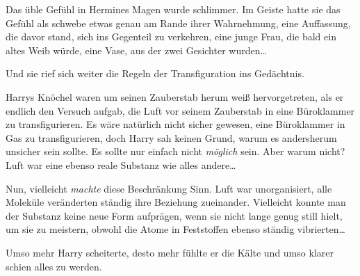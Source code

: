 Das üble Gefühl in Hermines Magen wurde schlimmer. Im Geiste hatte sie das Gefühl als schwebe etwas genau am Rande ihrer Wahrnehmung, eine Auffassung, die davor stand, sich ins Gegenteil zu verkehren, eine junge Frau, die bald ein altes Weib würde, eine Vase, aus der zwei Gesichter wurden…

Und sie rief sich weiter die Regeln der Transfiguration ins Gedächtnis.

\later

Harrys Knöchel waren um seinen Zauberstab herum weiß hervorgetreten, als er endlich den Versuch aufgab, die Luft vor seinem Zauberstab in eine Büroklammer zu transfigurieren. Es wäre natürlich nicht sicher gewesen, eine Büroklammer in Gas zu transfigurieren, doch Harry sah keinen Grund, warum es andersherum unsicher sein sollte. Es sollte nur einfach nicht \emph{möglich} sein. Aber warum nicht? Luft war eine ebenso reale Substanz wie alles andere…

Nun, vielleicht \emph{machte} diese Beschränkung Sinn. Luft war unorganisiert, alle Moleküle veränderten ständig ihre Beziehung zueinander. Vielleicht konnte man der Substanz keine neue Form aufprägen, wenn sie nicht lange genug still hielt, um sie zu meistern, obwohl die Atome in Feststoffen ebenso ständig vibrierten…

Umso mehr Harry scheiterte, desto mehr fühlte er die Kälte und umso klarer schien alles zu werden.

